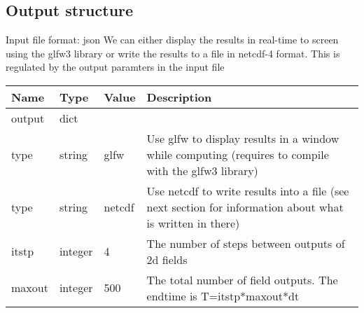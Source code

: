 \subsection{Output structure}
Input file format: json
We can either display the results in real-time to screen using the glfw3 library or
write the results to a file in netcdf-4 format.
This is regulated by the output paramters in the input file
\begin{longtable}{lllp{7cm}}
\toprule
\rowcolor{gray!50}\textbf{Name} &  \textbf{Type} & \textbf{Value}  & \textbf{Description}  \\ \midrule
output & dict & & \\
\qquad type  & string& glfw & Use glfw to display results in a window while computing (requires to compile with the glfw3 library) \\
\qquad type  & string& netcdf & Use netcdf to write results into a file (see next section for information about what is written in there) \\
\qquad itstp  & integer& 4 & The number of steps between outputs of 2d fields \\
\qquad maxout  & integer& 500 & The total number of field outputs. The endtime is T=itstp*maxout*dt \\
\bottomrule
\end{longtable}
